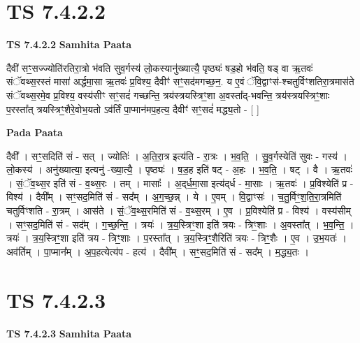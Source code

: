 \documentclass[17pt]{extarticle}
\begin{document}

\section{ TS 7.4.2.2 }

\textbf{TS 7.4.2.2 } \newline
\textbf{Samhita Paata} \newline

दैवी॑ सꣳ॒॒सज्ज्योति॑रतिरा॒त्रो भ॑वति सुव॒र्गस्य॑ लो॒कस्यानु॑ख्यात्यै॒ पृष्ठ्यः॑ षड॒हो भ॑वति॒ षड् वा ऋ॒तवः॑ संॅवथ्स॒रस्तं मासा॑ अर्द्धमा॒सा ऋ॒तवः॑ प्र॒विश्य॒ दैवीꣳ॑ सꣳ॒॒सद॑मगच्छ॒न॒. य ए॒वं ॅवि॒द्वाꣳस॑-श्चतुर्विꣳशतिरा॒त्रमास॑ते संॅवथ्स॒रमे॒व प्र॒विश्य॒ वस्य॑सीꣳ सꣳ॒॒सदं॑ गच्छन्ति॒ त्रय॑स्त्रयस्त्रिꣳ॒॒शा अ॒वस्ता᳚द्-भवन्ति॒ त्रय॑स्त्रयस्त्रिꣳ॒॒शाः प॒रस्ता᳚त् त्रयस्त्रिꣳ॒॒शैरे॒वोभ॒यतो ऽव॑र्तिं पा॒प्मान॑मप॒हत्य॒ दैवीꣳ॑ सꣳ॒॒सदं॑ मद्ध्य॒तो - [  ] \newline

\textbf{Pada Paata} \newline

दैवी᳚ । सꣳ॒॒सदिति॑ सं - सत् । ज्योतिः॑ । अ॒ति॒रा॒त्र इत्य॑ति - रा॒त्रः । भ॒व॒ति॒ । सु॒व॒र्गस्येति॑ सुवः - गस्य॑ । लो॒कस्य॑ । अनु॑ख्यात्या॒ इत्यनु॑ -ख्या॒त्यै॒ । पृष्ठ्यः॑ । ष॒ड॒ह इति॑ षट् - अ॒हः । भ॒व॒ति॒ । षट् । वै । ऋ॒तवः॑ । सं॒ॅव॒थ्स॒र इति॑ सं - व॒थ्स॒रः । तम् । मासाः᳚ । अ॒द्‌र्ध॒मा॒सा इत्य॑द्‌र्ध - मा॒साः । ऋ॒तवः॑ । प्र॒विश्येति॑ प्र - विश्य॑ । दैवी᳚म् । सꣳ॒॒सद॒मिति॑ सं - सद᳚म् । अ॒ग॒च्छ॒न्न् । ये । ए॒वम् । वि॒द्वाꣳसः॑ । च॒तु॒र्विꣳ॒॒श॒ति॒रा॒त्रमिति॑ चतुर्विꣳशति - रा॒त्रम् । आस॑ते । सं॒ॅव॒थ्स॒रमिति॑ सं - व॒थ्स॒रम् । ए॒व । प्र॒विश्येति॑ प्र - विश्य॑ । वस्य॑सीम् । सꣳ॒॒सद॒मिति॑ सं - सद᳚म् । ग॒च्छ॒न्ति॒ । त्रयः॑ । त्र॒य॒स्त्रिꣳ॒॒शा इति॑ त्रयः - त्रिꣳ॒॒शाः । अ॒वस्ता᳚त् । भ॒व॒न्ति॒ । त्रयः॑ । त्र॒य॒स्त्रिꣳ॒॒शा इति॑ त्रय - त्रिꣳ॒॒शाः । प॒रस्ता᳚त् । त्र॒य॒स्त्रिꣳ॒॒शैरिति॑ त्रयः - त्रिꣳ॒॒शैः । ए॒व । उ॒भ॒यतः॑ । अव॑र्तिम् । पा॒प्मान᳚म् । अ॒प॒हत्येत्य॑प - हत्य॑ । दैवी᳚म् । सꣳ॒॒सद॒मिति॑ सं - सद᳚म् । म॒द्ध्य॒तः ।  \newline





\section{ TS 7.4.2.3 }

\textbf{TS 7.4.2.3 } \newline
\textbf{Samhita Paata} \newline
\end{document}
